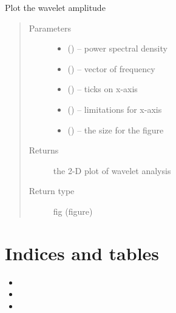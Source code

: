 \documentclass[letterpaper,10pt,english]{sphinxmanual}
\begin{document}
\begin{fulllineitems}
\label{\detokenize{Spectral:pyleoclim.Spectral.plot_psd}}
Plot the wavelet amplitude
\begin{quote}\begin{description}
\item[{Parameters}] \leavevmode\begin{itemize}
\item {} 
 () -- power spectral density

\item {} 
 () -- vector of frequency

\item {} 
 () -- ticks on x-axis

\item {} 
 () -- limitations for x-axis

\item {} 
 () -- the size for the figure

\end{itemize}

\item[{Returns}] \leavevmode
the 2-D plot of wavelet analysis

\item[{Return type}] \leavevmode
fig (figure)

\end{description}\end{quote}

\end{fulllineitems}



\chapter{Indices and tables}
\label{\detokenize{index:indices-and-tables}}\begin{itemize}
\item {} 

\item {} 

\item {} 

\end{itemize}



\renewcommand{\indexname}{Index}
\printindex
\end{document}
